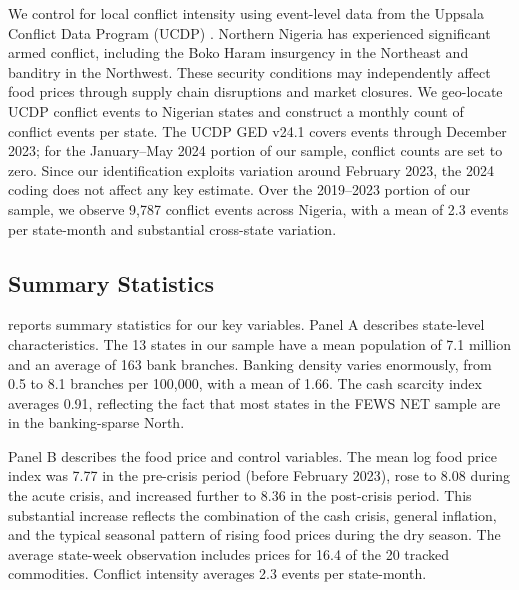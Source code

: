 \documentclass[12pt]{article}
\begin{document}
We control for local conflict intensity using event-level data from the Uppsala Conflict Data Program (UCDP) \citep{sundararaman2023ucdp}. Northern Nigeria has experienced significant armed conflict, including the Boko Haram insurgency in the Northeast and banditry in the Northwest. These security conditions may independently affect food prices through supply chain disruptions and market closures. We geo-locate UCDP conflict events to Nigerian states and construct a monthly count of conflict events per state. The UCDP GED v24.1 covers events through December 2023; for the January--May 2024 portion of our sample, conflict counts are set to zero. Since our identification exploits variation around February 2023, the 2024 coding does not affect any key estimate. Over the 2019--2023 portion of our sample, we observe 9,787 conflict events across Nigeria, with a mean of 2.3 events per state-month and substantial cross-state variation.

\subsection{Summary Statistics}

 reports summary statistics for our key variables. Panel A describes state-level characteristics. The 13 states in our sample have a mean population of 7.1 million and an average of 163 bank branches. Banking density varies enormously, from 0.5 to 8.1 branches per 100,000, with a mean of 1.66. The cash scarcity index averages 0.91, reflecting the fact that most states in the FEWS NET sample are in the banking-sparse North.

Panel B describes the food price and control variables. The mean log food price index was 7.77 in the pre-crisis period (before February 2023), rose to 8.08 during the acute crisis, and increased further to 8.36 in the post-crisis period. This substantial increase reflects the combination of the cash crisis, general inflation, and the typical seasonal pattern of rising food prices during the dry season. The average state-week observation includes prices for 16.4 of the 20 tracked commodities. Conflict intensity averages 2.3 events per state-month.
\end{document}
